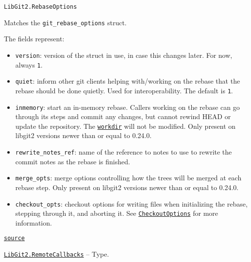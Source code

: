 \begin{adjustwidth}{2em}{0pt}


\begin{verbatim}
LibGit2.RebaseOptions
\end{verbatim}

Matches the \texttt{git\_rebase\_options} struct.

The fields represent:

\begin{itemize}
\item \texttt{version}: version of the struct in use, in case this changes later. For now, always \texttt{1}.


\item \texttt{quiet}: inform other git clients helping with/working on the rebase that the rebase should be done {\textquotedbl}quietly{\textquotedbl}. Used for interoperability. The default is \texttt{1}.


\item \texttt{inmemory}: start an in-memory rebase. Callers working on the rebase can go through its steps and commit any changes, but cannot rewind HEAD or update the repository. The \hyperlink{6689577338311178757}{\texttt{workdir}} will not be modified. Only present on libgit2 versions newer than or equal to 0.24.0.


\item \texttt{rewrite\_notes\_ref}: name of the reference to notes to use to rewrite the commit notes as the rebase is finished.


\item \texttt{merge\_opts}: merge options controlling how the trees will be merged at each rebase step.  Only present on libgit2 versions newer than or equal to 0.24.0.


\item \texttt{checkout\_opts}: checkout options for writing files when initializing the rebase, stepping through it, and aborting it. See \hyperlink{16441061243067746546}{\texttt{CheckoutOptions}} for more information.

\end{itemize}


\href{https://github.com/JuliaLang/julia/blob/44fa15b1502a45eac76c9017af94332d4557b251/base/#L0-L18}{\texttt{source}}


\end{adjustwidth}
\hypertarget{5220283667301575523}{} 
\hyperlink{5220283667301575523}{\texttt{LibGit2.RemoteCallbacks}}  -- {Type.}

